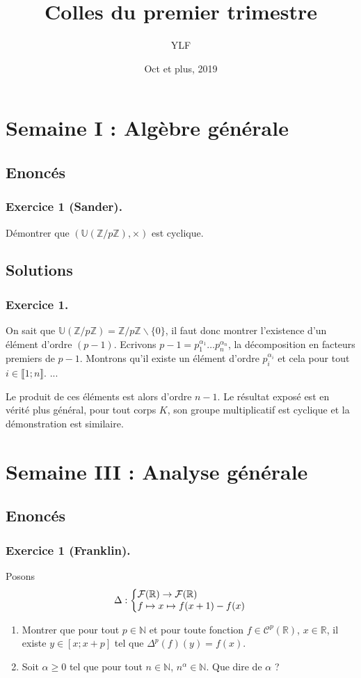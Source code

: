 \documentclass{article}
\begin{document}
\title{Colles du premier trimestre}
\author{YLF}
\date{Oct et plus, 2019}
\maketitle

\section{Semaine I : Algèbre générale}
\subsection*{Enoncés}
\subsubsection*{Exercice 1 (Sander).}
Démontrer que $(\mathbb{U}(\mathbb{Z}/p\mathbb{Z}), \times)$ est cyclique.
\subsection*{Solutions}
\subsubsection*{Exercice 1.}
On sait que $\mathbb{U}(\mathbb{Z}/p\mathbb{Z}) = \mathbb{Z}/p\mathbb{Z}\backslash\{0\}$, il faut donc montrer l'existence d'un élément d'ordre $(p-1)$. Ecrivons $p-1 = p_1^{\alpha_1}\ldots p_n^{\alpha_n}$, la décomposition en facteurs premiers de $p-1$. Montrons qu'il existe un élément d'ordre $p_i^{\alpha_i}$ et cela pour tout $i\in\llbracket 1;n \rrbracket$.
...

Le produit de ces éléments est alors d'ordre $n-1$. Le résultat exposé est en vérité plus général, pour tout corps $K$, son groupe multiplicatif est cyclique et la démonstration est similaire.
\section{Semaine III : Analyse générale}
\subsection*{Enoncés}
\subsubsection*{Exercice 1 (Franklin).}
Posons
\begin{align*}
	\Delta : \left\{
		\begin{array}{@{}l@{\thinspace}l}
			\mathcal{F}(\mathbb{R}) \to \mathcal{F}(\mathbb{R})\\
			f \mapsto x \mapsto f(x+1)-f(x)
		\end{array}
		\right.
	\end{align*}
	\begin{enumerate}
		\item Montrer que pour tout $p\in \mathbb{N}$ et pour toute fonction $f \in \mathcal{C}^p(\mathbb{R})$, $x\in\mathbb{R}$, il existe $y \in [x;x+p]$  tel que $\Delta^p(f)(y) = f(x)$.
		\item Soit $\alpha \geq 0$ tel que pour tout $n\in\mathbb{N}$, $n^{\alpha} \in\mathbb{N}$. Que dire de $\alpha$ ?
	\end{enumerate}
\end{document}
